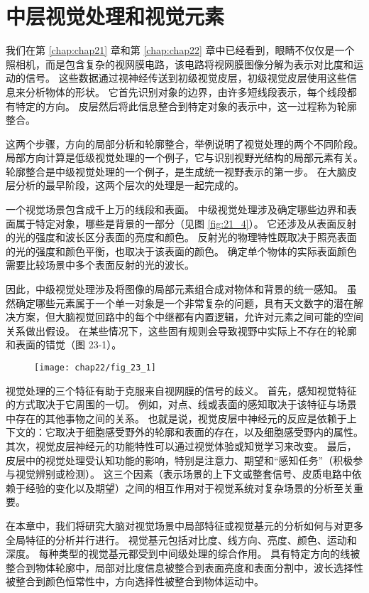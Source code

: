 \chapter{中层视觉处理和视觉元素} \label{chap:chap23}
我们在第 \ref{chap:chap21} 章和第 \ref{chap:chap22} 章中已经看到，眼睛不仅仅是一个照相机，而是包含复杂的视网膜电路，该电路将视网膜图像分解为表示对比度和运动的信号。 
这些数据通过视神经传送到初级视觉皮层，初级视觉皮层使用这些信息来分析物体的形状。 
它首先识别对象的边界，由许多短线段表示，每个线段都有特定的方向。 
皮层然后将此信息整合到特定对象的表示中，这一过程称为轮廓整合。


这两个步骤，方向的局部分析和轮廓整合，举例说明了视觉处理的两个不同阶段。 
局部方向计算是低级视觉处理的一个例子，它与识别视野光结构的局部元素有关。 
轮廓整合是中级视觉处理的一个例子，是生成统一视野表示的第一步。 
在大脑皮层分析的最早阶段，这两个层次的处理是一起完成的。


一个视觉场景包含成千上万的线段和表面。 
中级视觉处理涉及确定哪些边界和表面属于特定对象，哪些是背景的一部分（见图 \ref{fig:21_4}）。 
它还涉及从表面反射的光的强度和波长区分表面的亮度和颜色。 
反射光的物理特性既取决于照亮表面的光的强度和颜色平衡，也取决于该表面的颜色。 
确定单个物体的实际表面颜色需要比较场景中多个表面反射的光的波长。


因此，中级视觉处理涉及将图像的局部元素组合成对物体和背景的统一感知。 
虽然确定哪些元素属于一个单一对象是一个非常复杂的问题，具有天文数字的潜在解决方案，但大脑视觉回路中的每个中继都有内置逻辑，允许对元素之间可能的空间关系做出假设。
在某些情况下，这些固有规则会导致视野中实际上不存在的轮廓和表面的错觉（图 23-1）。


\begin{figure}[htbp]
	\centering
	\texttt{[image: chap22/fig\_23\_1]}
	\caption{}
	\label{fig:23_1}
\end{figure}


视觉处理的三个特征有助于克服来自视网膜的信号的歧义。 首先，感知视觉特征的方式取决于它周围的一切。 例如，对点、线或表面的感知取决于该特征与场景中存在的其他事物之间的关系。 也就是说，视觉皮层中神经元的反应是依赖于上下文的：它取决于细胞感受野外的轮廓和表面的存在，以及细胞感受野内的属性。 其次，视觉皮层神经元的功能特性可以通过视觉体验或知觉学习来改变。 最后，皮层中的视觉处理受认知功能的影响，特别是注意力、期望和“感知任务”（积极参与视觉辨别或检测）。 这三个因素（表示场景的上下文或整套信号、皮质电路中依赖于经验的变化以及期望）之间的相互作用对于视觉系统对复杂场景的分析至关重要。

在本章中，我们将研究大脑对视觉场景中局部特征或视觉基元的分析如何与对更多全局特征的分析并行进行。 视觉基元包括对比度、线方向、亮度、颜色、运动和深度。 每种类型的视觉基元都受到中间级处理的综合作用。 具有特定方向的线被整合到物体轮廓中，局部对比度信息被整合到表面亮度和表面分割中，波长选择性被整合到颜色恒常性中，方向选择性被整合到物体运动中。


